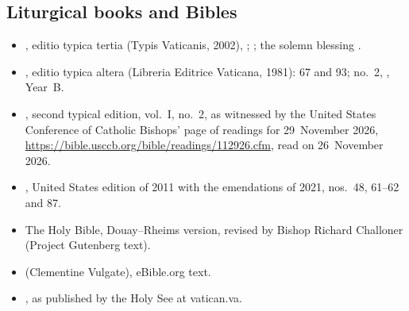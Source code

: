 {\scriptsize
\subsection*{Liturgical books and Bibles}
\begin{itemize}[itemsep=0pt,topsep=.25em]
\item {}, editio typica tertia (Typis Vaticanis, 2002), ; ; the solemn blessing .
\item {}, editio typica altera (Libreria Editrice Vaticana, 1981):  67 and 93; no.~2, , Year~B.
\item {}, second typical edition, vol.~I, no.~2, as witnessed by the United States Conference of Catholic Bishops' page of readings for 29~November 2026, \url{https://bible.usccb.org/bible/readings/112926.cfm}, read on 26~November 2026.
\item {}, United States edition of 2011 with the emendations of 2021, nos.~48, 61--62 and 87.
\item The Holy Bible, Douay--Rheims version, revised by Bishop Richard Challoner (Project Gutenberg text).
\item {} (Clementine Vulgate), eBible.org text.
\item {}, as published by the Holy See at vatican.va.
\end{itemize}

}
